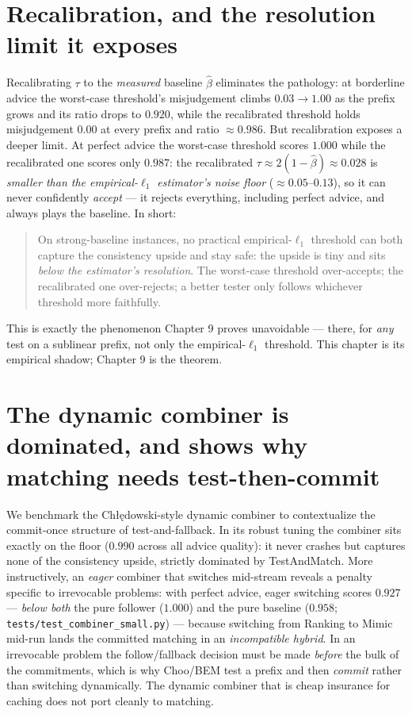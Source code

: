 \section{Recalibration, and the resolution limit it exposes}\label{recalibration-and-the-resolution-limit-it-exposes}

Recalibrating \(\tau\) to the \emph{measured} baseline \(\hat\beta\) eliminates the pathology: at
borderline advice the worst-case threshold's misjudgement climbs \(0.03\to1.00\) as the prefix
grows and its ratio drops to \(0.920\), while the recalibrated threshold holds misjudgement
\(0.00\) at every prefix and ratio \(\approx0.986\). But recalibration exposes a deeper limit.
At perfect advice the worst-case threshold scores \(1.000\) while the recalibrated one scores
only \(0.987\): the recalibrated \(\tau\approx2(1-\hat\beta)\approx0.028\) is \emph{smaller than the
empirical-\(\ell_1\) estimator's noise floor} (\(\approx0.05\)--\(0.13\)), so it can never
confidently \emph{accept} --- it rejects everything, including perfect advice, and always plays the
baseline. In short:

\begin{quote}
On strong-baseline instances, no practical empirical-\(\ell_1\) threshold can both capture
the consistency upside and stay safe: the upside is tiny and sits \emph{below the estimator's
resolution}. The worst-case threshold over-accepts; the recalibrated one over-rejects; a
better tester only follows whichever threshold more faithfully.
\end{quote}

This is exactly the phenomenon Chapter 9 proves unavoidable --- there, for \emph{any} test on a
sublinear prefix, not only the empirical-\(\ell_1\) threshold. This chapter is its empirical
shadow; Chapter 9 is the theorem.

\section{The dynamic combiner is dominated, and shows why matching needs test-then-commit}\label{the-dynamic-combiner-is-dominated-and-shows-why-matching-needs-test-then-commit}

We benchmark the Chłędowski-style dynamic combiner to contextualize the commit-once structure
of test-and-fallback. In its robust tuning the combiner sits exactly on the floor (\(0.990\)
across all advice quality): it never crashes but captures none of the consistency upside,
strictly dominated by TestAndMatch. More instructively, an \emph{eager} combiner that switches
mid-stream reveals a penalty specific to irrevocable problems: with perfect advice, eager
switching scores \(0.927\) --- \emph{below both} the pure follower (\(1.000\)) and the pure baseline
(\(0.958\); \texttt{tests/test\_combiner\_small.py}) --- because switching from Ranking to Mimic mid-run
lands the committed matching in an \emph{incompatible hybrid}. In an irrevocable problem the
follow/fallback decision must be made \emph{before} the bulk of the commitments, which is why
Choo/BEM test a prefix and then \emph{commit} rather than switching dynamically. The dynamic
combiner that is cheap insurance for caching does not port cleanly to matching.


